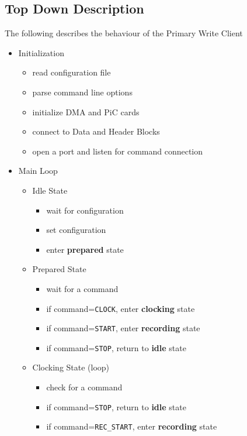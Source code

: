 \subsection{Top Down Description}

The following describes the behaviour of the Primary Write Client

\begin{itemize}
\item Initialization
\vspace{-3mm}
	\begin{itemize}
	\item read configuration file
	\item parse command line options
	\item initialize DMA and PiC cards
	\item connect to Data and Header Blocks
	\item open a port and listen for command connection
	\end{itemize}
\item Main Loop
\vspace{-3mm}
	\begin{itemize}
	\item Idle State
	\vspace{-2mm}
		\begin{itemize}
		\item wait for configuration
		\item set configuration
		\item enter {\bf prepared} state
		\end{itemize}
	\item Prepared State
	\vspace{-2mm}
		\begin{itemize}
		\item wait for a command
		\item if command={\tt CLOCK}, enter {\bf clocking} state
		\item if command={\tt START}, enter {\bf recording} state
		\item if command={\tt STOP}, return to {\bf idle} state
		\end{itemize}
	\item Clocking State (loop)
	\vspace{-2mm}
		\begin{itemize}
		\item check for a command
		\item if command={\tt STOP}, return to {\bf idle} state
		\item if command={\tt REC\_START}, enter {\bf recording} state

\end{itemize}
\end{itemize}
\end{itemize}
